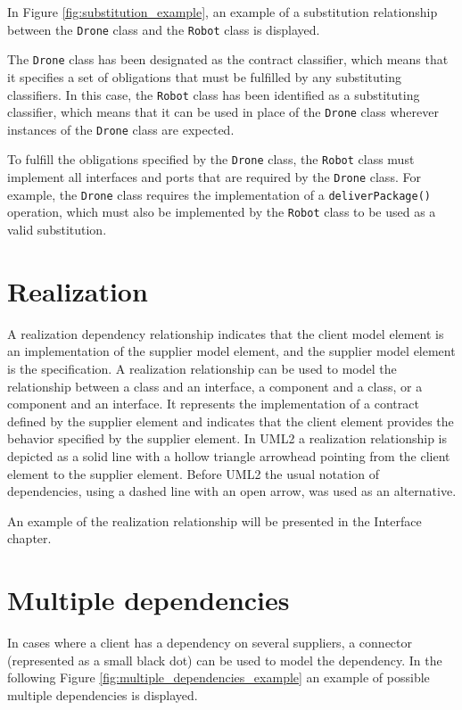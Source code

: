 \documentclass[
	12pt,
    a4paper,
    egregdoesnotlikesansseriftitles, %
    toc=chapterentrywithdots,
    oneside, openany,
    titlepage,
    parskip=half,
    headings=normal,  %
    listof=totoc,
    bibliography=totocnumbered,
    index=totoc,
    captions=tableheading,  %
    listof=flat,
    numbers=noenddot, %
    final]
    {scrbook}
\begin{document}
In Figure \ref{fig:substitution_example}, an example of a substitution relationship between the \texttt{Drone} class and the \texttt{Robot} class is displayed.

The \texttt{Drone} class has been designated as the contract classifier, which means that it specifies a set of obligations that must be fulfilled by any substituting classifiers. In this case, the \texttt{Robot} class has been identified as a substituting classifier, which means that it can be used in place of the \texttt{Drone} class wherever instances of the \texttt{Drone} class are expected.

To fulfill the obligations specified by the \texttt{Drone} class, the \texttt{Robot} class must implement all interfaces and ports that are required by the \texttt{Drone} class. For example, the \texttt{Drone} class requires the implementation of a \texttt{deliverPackage()} operation, which must also be implemented by the \texttt{Robot} class to be used as a valid substitution.


\section{Realization}
A realization dependency relationship indicates that the client model element is an implementation of the supplier model element, and the supplier model element is the specification.
A realization relationship can be used to model the relationship between a class and an interface, a component and a class, or a component and an interface. 
It represents the implementation of a contract defined by the supplier element and indicates that the client element provides the behavior specified by the supplier element.
In UML2 a realization relationship is depicted as a solid line with a hollow triangle arrowhead pointing from the client element to the supplier element.
Before UML2 the usual notation of dependencies, using a dashed line with an open arrow, was used as an alternative. \cite[p. 164]{uml}

An example of the realization relationship will be presented in the Interface chapter.


\section{Multiple dependencies}

In cases where a client has a dependency on several suppliers, a connector (represented as a small black dot) can be used to model the dependency.  \cite[p. 160]{uml}
In the following Figure \ref{fig:multiple_dependencies_example} an example of possible multiple dependencies is displayed.
\end{document}
